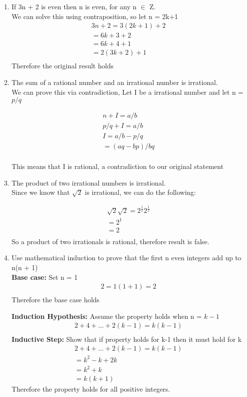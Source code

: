 \documentclass{article}
\begin{document}
\begin{enumerate}
\item If 3n + 2 is even then n is even, for any n $\in$ Z. \\
We can solve this using contraposition, so let n = 2k+1
\begin{align*}
3n + 2 = 3(2k + 1) + 2 \\
= 6k + 3 + 2 \\
= 6k + 4 + 1 \\
= 2(3k + 2) + 1 \\
\end{align*}
Therefore the original result holds

\item The sum of a rational number and an irrational number is irrational. \\
We can prove this via contradiction, Let I be a irrational number and let n = $p/q$

\begin{align*}
n + I =a/b \\
p/q + I = a/b \\
I =a/b - p/q \\
= (aq-bp)/bq \\
\end{align*}

This means that I is rational, a contradiction to our original statement

\item The product of two irrational numbers is irrational. \\
Since we know that $\sqrt{2}$ is irrational, we can do the following:

\begin{align*}
\sqrt{2}\sqrt{2} = 2^{\frac{1}{2}} 2^{\frac{1}{2}} \\
= 2^1 \\
= 2 \\
\end{align*}
So a product of two irrationals is rational, therefore result is false.

\item Use mathematical induction to prove that the first n even integers add up to n(n + 1) \\
\textbf{Base case: }Set n = 1
\begin{align*}
2 = 1(1 + 1) = 2 \\
\end{align*}
Therefore the base case holds 

\textbf{Induction Hypothesis: }Assume the property holds when n = $k - 1$ \\
\begin{align*}
     2 + 4 +. . .+ 2(k-1) =k(k-1) \\
\end{align*}
\textbf{Inductive Step: }Show that if property holds for k-1 then it must hold for k \\
\begin{align*}
    2+4+...+2(k-1)=k(k-1)  \\
    = k^2-k+2k \\
    = k^2+k \\
    = k(k+1)
\end{align*}
Therefore the property holds for all positive integers.



\end{enumerate}
\end{document}
